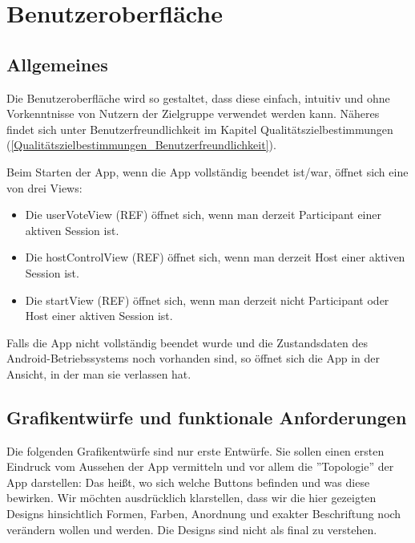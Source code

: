 \documentclass[oneside, ngerman]{sdqtechreport}
\begin{document}
\chapter{Benutzeroberfläche}
\label{chap:Benutzeroberfläche}

\section{Allgemeines}
\label{sec:Benutzeroberfläche:Allgemeines}
Die Benutzeroberfläche wird so gestaltet, dass diese einfach, intuitiv und ohne Vorkenntnisse von Nutzern der Zielgruppe verwendet werden kann. Näheres findet sich unter Benutzerfreundlichkeit im Kapitel Qualitätszielbestimmungen (\ref{Qualitätszielbestimmungen_Benutzerfreundlichkeit}).

Beim Starten der App, wenn die App vollständig beendet ist/war, öffnet sich eine von drei Views:
\begin{itemize}
    \item Die userVoteView (REF) öffnet sich, wenn man derzeit Participant einer aktiven Session ist.
    \item Die hostControlView (REF) öffnet sich, wenn man derzeit Host einer aktiven Session ist.
    \item Die startView (REF) öffnet sich, wenn man derzeit nicht Participant oder Host einer aktiven Session ist.
\end{itemize}
Falls die App nicht vollständig beendet wurde und die Zustandsdaten des Android-Betriebssystems noch vorhanden sind, so öffnet sich die App in der Ansicht, in der man sie verlassen hat.



\section{Grafikentwürfe und funktionale Anforderungen}
\label{sec:Benutzeroberfläche:Grafiken}

Die folgenden Grafikentwürfe sind nur erste Entwürfe. Sie sollen einen ersten Eindruck vom Aussehen der App vermitteln und vor allem die ''Topologie'' der App darstellen: Das heißt, wo sich welche Buttons befinden und was diese bewirken. Wir möchten ausdrücklich klarstellen, dass wir die hier gezeigten Designs hinsichtlich Formen, Farben, Anordnung und exakter Beschriftung noch verändern wollen und werden. Die Designs sind nicht als final zu verstehen.
\end{document}
